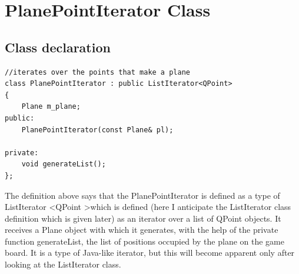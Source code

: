 \documentclass{article}
\begin{document}
\section{PlanePointIterator Class}

\subsection {Class declaration}

\begin{lstlisting}
//iterates over the points that make a plane
class PlanePointIterator : public ListIterator<QPoint>
{
    Plane m_plane;
public:
    PlanePointIterator(const Plane& pl);

private:
    void generateList();
};
\end{lstlisting}

The definition above says that the PlanePointIterator is defined as a type of ListIterator \textless QPoint \textgreater which is defined (here I anticipate the ListIterator class definition which is given later) as an iterator over a list of QPoint objects. It receives a Plane object with which it generates, with the help of the private function generateList, the list of positions occupied by the plane on the game board. It is a type of Java-like iterator, but this will become apparent only after looking at the ListIterator class. 
\end{document}
